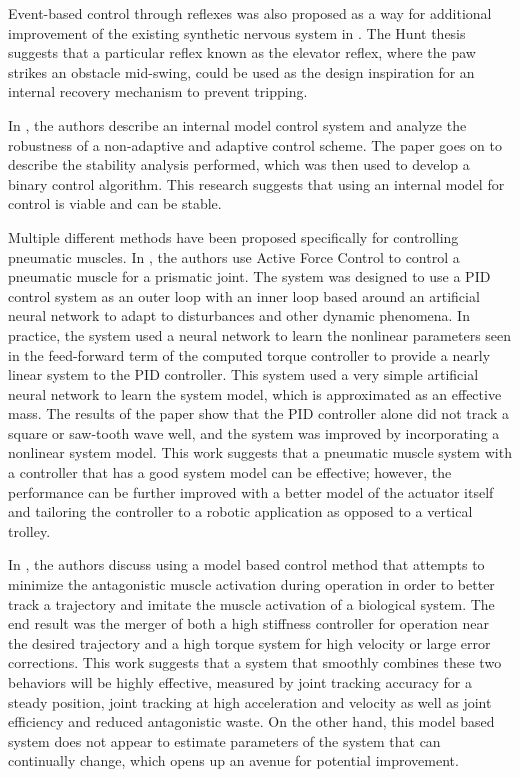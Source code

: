 Event-based control through reflexes was also proposed as a way for additional
improvement of the existing synthetic nervous system in \cite{HuntPhDThesis}.
The Hunt thesis \cite{HuntPhDThesis} suggests that a particular reflex known as the elevator reflex,
where the paw strikes an
obstacle mid-swing, could be used as the design inspiration for an internal recovery
mechanism to prevent tripping.


In \cite{InternalModel}, the authors describe an internal model control system and analyze the robustness of a non-adaptive and adaptive control scheme. The paper goes on to describe the stability analysis performed, which was then used to develop a binary control algorithm. This research suggests that using an internal model for control is viable and can be stable.


Multiple different methods have been proposed specifically for controlling pneumatic muscles. In \cite{Jahanabadi2009}, the authors use Active Force Control
to control a pneumatic muscle for a prismatic joint. The system was designed to
use a PID control system as an outer loop with an inner loop based around an
artificial neural network to adapt to disturbances and other dynamic phenomena.
In practice, the system used a neural network to learn the nonlinear parameters
seen in the feed-forward term of the computed torque controller to provide a
nearly linear system to the PID controller. This system used a very simple
artificial neural network to learn the system model, which is approximated as an
effective mass. The results of the paper show that the PID controller alone did
not track a square or saw-tooth wave well, and the system was improved by
incorporating a nonlinear system model. This work suggests that a pneumatic 
muscle system with a controller that has a good system model can be effective; however, the performance can be further improved with a better model of the
actuator itself and tailoring the controller to a robotic application as opposed
to a vertical trolley.

In \cite{Wang2013}, the authors discuss using a model based control method that
attempts to minimize the antagonistic muscle activation during operation in
order to better track a trajectory and imitate the muscle activation of a
biological system. The end result was the merger of both a high stiffness 
controller for operation near the desired trajectory and a high torque system
for high velocity or large error corrections. This work suggests that a system 
that smoothly combines these two behaviors will be highly effective, measured by
joint tracking accuracy for a steady position, joint tracking at high 
acceleration and velocity as well as joint efficiency and reduced antagonistic
waste. On the other hand, this model based system does not appear to estimate
parameters of the system that can continually change, which opens up an avenue
for potential improvement.

